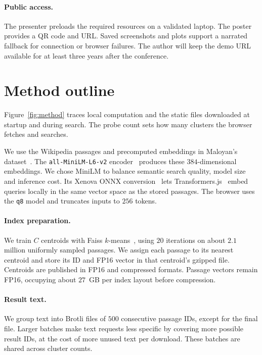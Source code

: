 \documentclass[sigconf, screen, review, balance=false]{acmart}
\begin{document}
\paragraph{Public access.}
The presenter preloads the required resources on a validated laptop. The poster provides a QR code and URL. Saved screenshots and plots support a narrated fallback for connection or browser failures. The author will keep the demo URL available for at least three years after the conference.


\section{Method outline}
Figure~\ref{fig:method} traces local computation and the static files downloaded at startup and during search. The probe count sets how many clusters the browser fetches and searches.

We use the Wikipedia passages and precomputed embeddings in Maloyan's dataset~\cite{wiki-minilm}. The \texttt{all-MiniLM-L6-v2} encoder~\cite{minilm-model-card} produces these $384$-dimensional embeddings. We chose MiniLM to balance semantic search quality, model size and inference cost. Its Xenova ONNX conversion~\cite{xenova-model-card} lets Transformers.js~\cite{transformersjs} embed queries locally in the same vector space as the stored passages. The browser uses the \texttt{q8} model and truncates inputs to $256$ tokens.


\paragraph{Index preparation.}
We train $C$ centroids with Faiss $k$-means~\cite{Faiss}, using $20$ iterations on about $2.1$ million uniformly sampled passages. We assign each passage to its nearest centroid and store its ID and FP16 vector in that centroid's gzipped file. Centroids are published in FP16 and compressed formats. Passage vectors remain FP16, occupying about $27$~GB per index layout before compression.

\paragraph{Result text.}
We group text into Brotli files of $500$ consecutive passage IDs, except for the final file. Larger batches make text requests less specific by covering more possible result IDs, at the cost of more unused text per download. These batches are shared across cluster counts.
\end{document}
